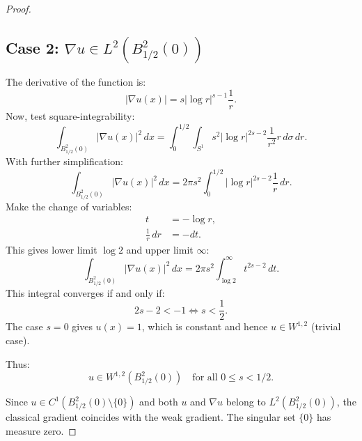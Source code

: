 \begin{proof}
\subsection{Case 2: $\nabla u\in L^2(B_{1/2}^2(0))$}
The derivative of the function is:
\[
|\nabla u(x)| = s|\log r|^{s-1}\frac{1}{r}.
\]
Now, test square-integrability:
\[
\int_{B_{1/2}^2(0)} |\nabla u(x)|^2 \, dx = \int_0^{1/2}\int_{S^1} s^2|\log r|^{2s-2}\frac{1}{r^2}r \, d\sigma\, dr.
\]
With further simplification:
\begin{equation}
    \int_{B_{1/2}^2(0)} |\nabla u(x)|^2 \, dx = 2\pi s^2\int_0^{1/2} |\log r|^{2s-2}\frac{1}{r} \, dr.
\end{equation}
Make the change of variables:
\begin{align*}
    t &= -\log r, \\
    \frac{1}{r}\, dr &= -dt.
\end{align*}
This gives lower limit $\log 2$ and upper limit $\infty$:
\[
\int_{B_{1/2}^2(0)} |\nabla u(x)|^2 \, dx = 2\pi s^2\int_{\log 2}^\infty t^{2s-2} \, dt.
\]
This integral converges if and only if:
\[
2s-2 < -1 \iff s < \frac{1}{2}.
\]
The case $s=0$ gives $u(x)=1$, which is constant and hence $u\in W^{1,2}$ (trivial case). 

Thus:
\[
\boxed{
u\in W^{1,2}(B_{1/2}^2(0)) \quad \text{for all } 0\le s<1/2.
}
\]

Since $u\in C^1(B_{1/2}^2(0)\setminus\{0\})$ and both $u$ and $\nabla u$ belong to $L^2(B_{1/2}^2(0))$, the classical gradient coincides with the weak gradient. The singular set $\{0\}$ has measure zero.
\end{proof}

